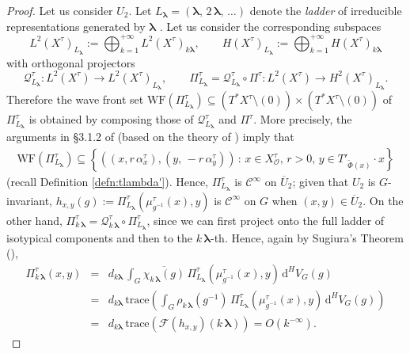 \documentclass[12pt,a4paper]{article}
\theoremstyle{plain}
\theoremstyle{definition}
\begin{document}
\begin{proof}
Let us consider $U_2$. 
Let $L_{\boldsymbol{\lambda}}=(\boldsymbol{\lambda},\,2\,\boldsymbol{\lambda},
\,\ldots)$ denote the \textit{ladder} of irreducible representations
generated by $\boldsymbol{\lambda}$ \cite{gstb82}. 
Let us consider the corresponding subspaces
$$
L^2(X^\tau)_{L_{\boldsymbol{\lambda}}}:=\bigoplus_{k=1}^{+\infty} 
L^2(X^\tau)_{k\boldsymbol{\lambda}},\qquad
%
H(X^\tau)_{L_{\boldsymbol{\lambda}}}:=\bigoplus_{k=1}^{+\infty} 
H(X^\tau)_{k\boldsymbol{\lambda}}
$$
with orthogonal projectors
$$
\mathcal{Q}^\tau_{L_{\boldsymbol{\lambda}}}:
L^2(X^\tau)\rightarrow L^2(X^\tau)_{L_{\boldsymbol{\lambda}}},
\qquad
\Pi^\tau_{L_{\boldsymbol{\lambda}}}=\mathcal{Q}^\tau_{L_{\boldsymbol{\lambda}}}
\circ \Pi^\tau :
L^2(X^\tau)\rightarrow H^2(X^\tau)_{L_{\boldsymbol{\lambda}}}.
$$
Therefore the wave front set 
$\mathrm{WF}(\Pi^\tau_{L_{\boldsymbol{\lambda}}})\subseteq \left(T^*X^\tau\setminus (0)\right)
\times \left(T^*X^\tau\setminus (0)\right)$
of $\Pi^\tau_{L_{\boldsymbol{\lambda}}}$
is obtained by composing those of 
$\mathcal{Q}^\tau_{L_{\boldsymbol{\lambda}}}$
and $\Pi^\tau$.
More precisely, the arguments in \S 3.1.2 of \cite{gp19} (based on the theory of
\cite{gstb82}) imply that
\begin{eqnarray}
\label{eqn:wave front piL}
\mathrm{WF}(\Pi^\tau_{L_{\boldsymbol{\lambda}}})\subseteq 
\left\{\left((x,r\,\alpha^\tau_x),(y,\,-r\,\alpha^\tau_y)\right) \,:\, 
x\in X^\tau_{\mathcal{O}},\,r>0,\,y\in T'_{\tilde{\Phi}(x)}\cdot x
 \right\}
\end{eqnarray}
(recall Definition \ref{defn:tlambda'}).
Hence, $\Pi^\tau_{L_{\boldsymbol{\lambda}}}$
is $\mathcal{C}^\infty$ on $\overline{U}_2$; given that $U_2$ is $G$-invariant, 
$h_{x,y}(g):=\Pi^\tau_{L_{\boldsymbol{\lambda}}}\left(\mu^\tau_{g^{-1}}(x),y   \right)$
is $\mathcal{C}^\infty$ on $G$ when $(x,y)\in \overline{U}_2$.
On the other hand, 
$\Pi^\tau_{k\,\boldsymbol{\lambda}}=\mathcal{Q}^\tau_{k\,\boldsymbol{\lambda}}
\circ \Pi^\tau_{L_{\boldsymbol{\lambda}}}$, since we can first project 
onto the full ladder of isotypical components and then to 
the $k\,\boldsymbol{\lambda}$-th. Hence, again by Sugiura's Theorem
(\cite{sug}),
\begin{eqnarray}
\label{eqn:equivariant ladder szego klambda}
\Pi^\tau_{k\,\boldsymbol{\lambda}}(x,y)&=&
d_{k\boldsymbol{\lambda}}\,
\int_G \overline{\chi_{k\,\boldsymbol{\lambda}}(g)}\,
\Pi^\tau_{L_{\boldsymbol{\lambda}}}
\left(\mu^\tau_{g^{-1}}(x),y   \right)\,
\mathrm{d}^HV_G(g)\nonumber\\
&=&d_{k\boldsymbol{\lambda}}\,
\mathrm{trace}\left(
\int_G \rho_{k\,\boldsymbol{\lambda}}(g^{-1})\,
\Pi^\tau_{L_{\boldsymbol{\lambda}}}
\left(\mu^\tau_{g^{-1}}(x),y   \right)\,
\mathrm{d}^HV_G(g)\right)\nonumber\\
&=&
d_{k\boldsymbol{\lambda}}\,
\mathrm{trace}\left(\mathcal{F}(h_{x,y})(k\,
\boldsymbol{\lambda})\right)=O\left(k^{-\infty}\right).
\end{eqnarray}


\end{proof}
\end{document}
